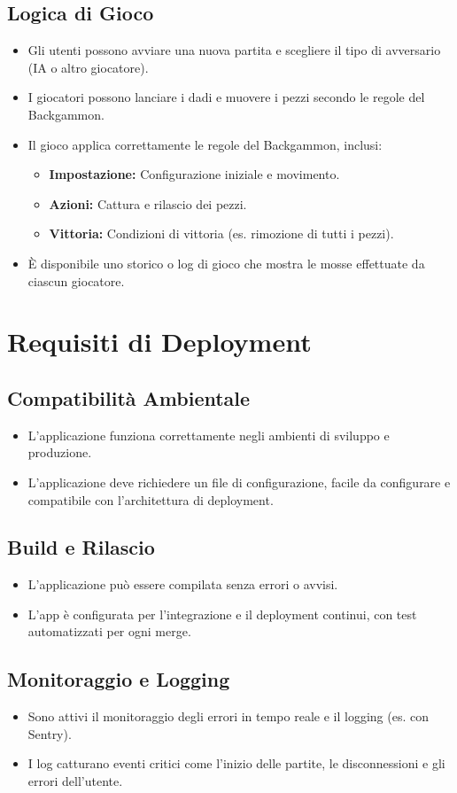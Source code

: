 \documentclass{article}
\begin{document}
\subsection{Logica di Gioco}
\begin{itemize}
    \item Gli utenti possono avviare una nuova partita e scegliere il tipo di avversario (IA o altro giocatore).
    \item I giocatori possono lanciare i dadi e muovere i pezzi secondo le regole del Backgammon.
    \item Il gioco applica correttamente le regole del Backgammon, inclusi:
    \begin{itemize}
        \item \textbf{Impostazione:} Configurazione iniziale e movimento.
        \item \textbf{Azioni:} Cattura e rilascio dei pezzi.
        \item \textbf{Vittoria:} Condizioni di vittoria (es. rimozione di tutti i pezzi).
    \end{itemize}
    \item È disponibile uno storico o log di gioco che mostra le mosse effettuate da ciascun giocatore.
\end{itemize}

\section{Requisiti di Deployment}

\subsection{Compatibilità Ambientale}
\begin{itemize}
    \item L'applicazione funziona correttamente negli ambienti di sviluppo e produzione.
    \item L'applicazione deve richiedere un file di configurazione, facile da configurare e compatibile con l'architettura di deployment.
\end{itemize}

\subsection{Build e Rilascio}
\begin{itemize}
    \item L'applicazione può essere compilata senza errori o avvisi.
    \item L'app è configurata per l'integrazione e il deployment continui, con test automatizzati per ogni merge.
\end{itemize}

\subsection{Monitoraggio e Logging}
\begin{itemize}
    \item Sono attivi il monitoraggio degli errori in tempo reale e il logging (es. con Sentry).
    \item I log catturano eventi critici come l'inizio delle partite, le disconnessioni e gli errori dell'utente.
\end{itemize}
\end{document}
